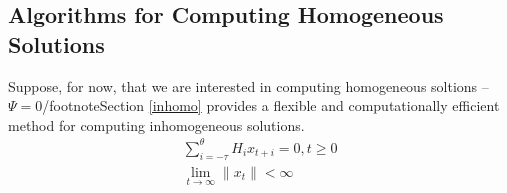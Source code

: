 \documentclass[12pt]{article}
\begin{document}




%   







\subsection{Algorithms for Computing Homogeneous Solutions }
\label{sec:homo}




Suppose, for now, that we are interested in computing homogeneous soltions -- $\Psi=0$/footnote{Section \ref{inhomo} provides a flexible 
and computationally efficient method for 
computing inhomogeneous solutions.}
\begin{gather}
\sum_{i= - \tau}^\theta{ H_i  x_{ t + i } }= 0, t \geq0\label{eq:homo}\\
\lim_{ t \rightarrow\infty} \|x_t\|   < \infty%
\end{gather}

\end{document}
